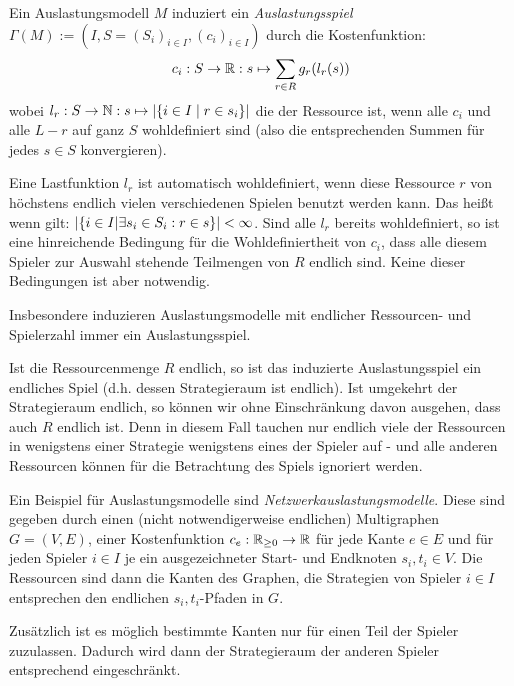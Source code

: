 \begin{defn}\label{def:Auslastungsspiel}
	Ein Auslastungsmodell $M$ induziert ein \emph{Auslastungsspiel} $\Gamma(M) := (I, S = (S_i)_{i\in I}, (c_i)_{i \in I})$ durch die Kostenfunktion:
	\[c_i: S \to \mathbb{R}: s \mapsto \sum_{r \in R} g_r(l_r(s)) \]
	wobei $l_r: S \to \mathbb{N}: s \mapsto \left|\{i\in I \mid r \in s_i\}\right|$ die der Ressource ist, wenn alle $c_i$ und alle $L-r$ auf ganz $S$ wohldefiniert sind (also die entsprechenden Summen für jedes $s \in S$ konvergieren).
\end{defn}

\begin{bem}
	Eine Lastfunktion $l_r$ ist automatisch wohldefiniert, wenn diese Ressource $r$ von höchstens endlich vielen verschiedenen Spielen benutzt werden kann. Das heißt wenn gilt: $\left|\left\{i \in I \middle| \exists s_i \in S_i: r \in s\right\}\right| < \infty$. Sind alle $l_r$ bereits wohldefiniert, so ist eine hinreichende Bedingung für die Wohldefiniertheit von $c_i$, dass alle diesem Spieler zur Auswahl stehende Teilmengen von $R$ endlich sind. Keine dieser Bedingungen ist aber notwendig.
	
	Insbesondere induzieren Auslastungsmodelle mit endlicher Ressourcen- und Spielerzahl immer ein Auslastungsspiel.
	
	Ist die Ressourcenmenge $R$ endlich, so ist das induzierte Auslastungsspiel ein endliches Spiel (d.h. dessen Strategieraum ist endlich). Ist umgekehrt der Strategieraum endlich, so können wir ohne Einschränkung davon ausgehen, dass auch $R$ endlich ist. Denn in diesem Fall tauchen nur endlich viele der Ressourcen in wenigstens einer Strategie wenigstens eines der Spieler auf - und alle anderen Ressourcen können für die Betrachtung des Spiels ignoriert werden.
\end{bem}

\begin{bsp}
	Ein Beispiel für Auslastungsmodelle sind \emph{Netzwerkauslastungsmodelle}. Diese sind gegeben durch einen (nicht notwendigerweise endlichen) Multigraphen $G=(V,E)$, einer Kostenfunktion $c_e: \mathbb{R}_{\geq 0} \to \mathbb{R}$ für jede Kante $e \in E$ und für jeden Spieler $i \in I$ je ein ausgezeichneter Start- und Endknoten $s_i, t_i \in V$. Die Ressourcen sind dann die Kanten des Graphen, die Strategien von Spieler $i \in I$ entsprechen den endlichen $s_i,t_i$-Pfaden in $G$. 
	
	Zusätzlich ist es möglich bestimmte Kanten nur für einen Teil der Spieler zuzulassen. Dadurch wird dann der Strategieraum der anderen Spieler entsprechend eingeschränkt.
\end{bsp}

